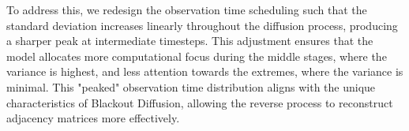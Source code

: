 To address this, we redesign the observation time scheduling such that the standard deviation increases linearly throughout the diffusion process, producing a sharper peak at intermediate timesteps. This adjustment ensures that the model allocates more computational focus during the middle stages, where the variance is highest, and less attention towards the extremes, where the variance is minimal. This "peaked" observation time distribution aligns with the unique characteristics of Blackout Diffusion, allowing the reverse process to reconstruct adjacency matrices more effectively.
